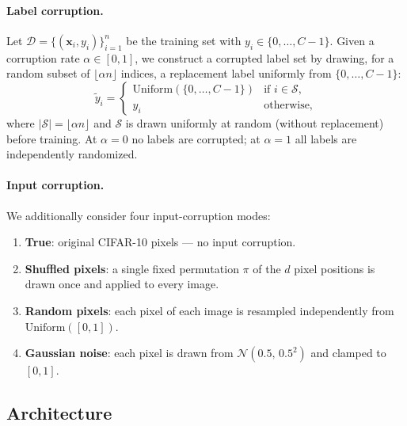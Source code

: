 \documentclass[12pt,a4paper]{article}
\theoremstyle{definition}
\theoremstyle{remark}
\begin{document}
\paragraph{Label corruption.}
Let $\mathcal{D} = \{(\mathbf{x}_i, y_i)\}_{i=1}^{n}$ be the training set
with $y_i \in \{0,\ldots,C{-}1\}$. Given a corruption rate
$\alpha \in [0,1]$, we construct a corrupted label set by drawing, for a
random subset of $\lfloor \alpha n \rfloor$ indices, a replacement label
uniformly from $\{0,\ldots,C{-}1\}$:
\begin{equation}
  \tilde{y}_i =
  \begin{cases}
    \mathrm{Uniform}(\{0,\ldots,C{-}1\}) & \text{if } i \in \mathcal{S},\\
    y_i & \text{otherwise,}
  \end{cases}
  \label{eq:corruption}
\end{equation}
where $|\mathcal{S}| = \lfloor \alpha n \rfloor$ and $\mathcal{S}$ is drawn
uniformly at random (without replacement) before training. At $\alpha = 0$
no labels are corrupted; at $\alpha = 1$ all labels are independently
randomized.

\paragraph{Input corruption.}
We additionally consider four input-corruption modes:
\begin{enumerate}
  \item \textbf{True}: original CIFAR-10 pixels --- no input corruption.
  \item \textbf{Shuffled pixels}: a single fixed permutation $\pi$ of the
        $d$ pixel positions is drawn once and applied to every image.
  \item \textbf{Random pixels}: each pixel of each image is resampled
        independently from $\mathrm{Uniform}([0,1])$.
  \item \textbf{Gaussian noise}: each pixel is drawn from
        $\mathcal{N}(0.5,\, 0.5^2)$ and clamped to $[0,1]$.
\end{enumerate}

\subsection{Architecture}
\label{sec:arch}
\end{document}

